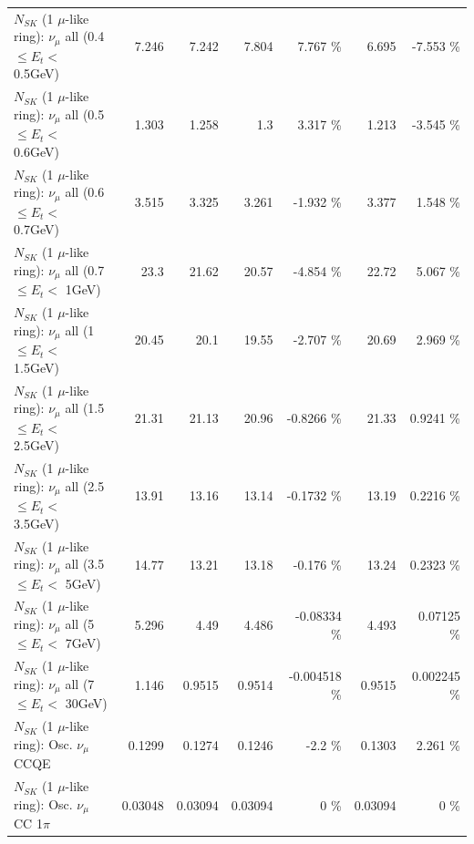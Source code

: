 \begin{table}
\begin{tabular}{| l | r | r | r  r | r  r |}
       $N_{SK}$ (1 $\mu$-like ring): $\nu_{\mu}$ all (0.4 $\leq E_{t} <$ 0.5GeV) &           7.246 &           7.242 &           7.804 &    7.767 \%  &           6.695 &   -7.553 \%  \\ 
       $N_{SK}$ (1 $\mu$-like ring): $\nu_{\mu}$ all (0.5 $\leq E_{t} <$ 0.6GeV) &           1.303 &           1.258 &             1.3 &    3.317 \%  &           1.213 &   -3.545 \%  \\ 
       $N_{SK}$ (1 $\mu$-like ring): $\nu_{\mu}$ all (0.6 $\leq E_{t} <$ 0.7GeV) &           3.515 &           3.325 &           3.261 &   -1.932 \%  &           3.377 &    1.548 \%  \\ 
         $N_{SK}$ (1 $\mu$-like ring): $\nu_{\mu}$ all (0.7 $\leq E_{t} <$ 1GeV) &            23.3 &           21.62 &           20.57 &   -4.854 \%  &           22.72 &    5.067 \%  \\ 
         $N_{SK}$ (1 $\mu$-like ring): $\nu_{\mu}$ all (1 $\leq E_{t} <$ 1.5GeV) &           20.45 &            20.1 &           19.55 &   -2.707 \%  &           20.69 &    2.969 \%  \\ 
       $N_{SK}$ (1 $\mu$-like ring): $\nu_{\mu}$ all (1.5 $\leq E_{t} <$ 2.5GeV) &           21.31 &           21.13 &           20.96 &  -0.8266 \%  &           21.33 &   0.9241 \%  \\ 
       $N_{SK}$ (1 $\mu$-like ring): $\nu_{\mu}$ all (2.5 $\leq E_{t} <$ 3.5GeV) &           13.91 &           13.16 &           13.14 &  -0.1732 \%  &           13.19 &   0.2216 \%  \\ 
         $N_{SK}$ (1 $\mu$-like ring): $\nu_{\mu}$ all (3.5 $\leq E_{t} <$ 5GeV) &           14.77 &           13.21 &           13.18 &   -0.176 \%  &           13.24 &   0.2323 \%  \\ 
           $N_{SK}$ (1 $\mu$-like ring): $\nu_{\mu}$ all (5 $\leq E_{t} <$ 7GeV) &           5.296 &            4.49 &           4.486 & -0.08334 \%  &           4.493 &  0.07125 \%  \\ 
          $N_{SK}$ (1 $\mu$-like ring): $\nu_{\mu}$ all (7 $\leq E_{t} <$ 30GeV) &           1.146 &          0.9515 &          0.9514 & -0.004518 \%  &          0.9515 & 0.002245 \%  \\ 
\hline
\hline
                               $N_{SK}$ (1 $\mu$-like ring): Osc. $\nu_\mu$ CCQE &          0.1299 &          0.1274 &          0.1246 &     -2.2 \%  &          0.1303 &    2.261 \%  \\ 
                          $N_{SK}$ (1 $\mu$-like ring): Osc. $\nu_\mu$ CC 1$\pi$ &         0.03048 &         0.03094 &         0.03094 &        0 \%  &         0.03094 &        0 \%  \\ 

\end{tabular}
\end{table}
